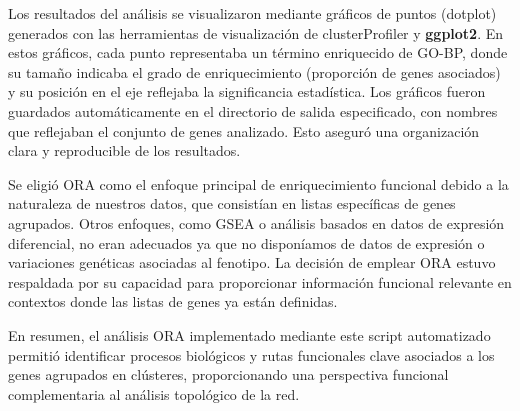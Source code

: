 Los resultados del análisis se visualizaron mediante gráficos de puntos (dotplot) generados con las herramientas de visualización de clusterProfiler y \textbf{ggplot2}. En estos gráficos, cada punto representaba un término enriquecido de GO-BP, donde su tamaño indicaba el grado de enriquecimiento (proporción de genes asociados) y su posición en el eje reflejaba la significancia estadística. Los gráficos fueron guardados automáticamente en el directorio de salida especificado, con nombres que reflejaban el conjunto de genes analizado. Esto aseguró una organización clara y reproducible de los resultados.

Se eligió ORA como el enfoque principal de enriquecimiento funcional debido a la naturaleza de nuestros datos, que consistían en listas específicas de genes agrupados. Otros enfoques, como GSEA o análisis basados en datos de expresión diferencial, no eran adecuados ya que no disponíamos de datos de expresión o variaciones genéticas asociadas al fenotipo. La decisión de emplear ORA estuvo respaldada por su capacidad para proporcionar información funcional relevante en contextos donde las listas de genes ya están definidas.

En resumen, el análisis ORA implementado mediante este script automatizado permitió identificar procesos biológicos y rutas funcionales clave asociados a los genes agrupados en clústeres, proporcionando una perspectiva funcional complementaria al análisis topológico de la red.




